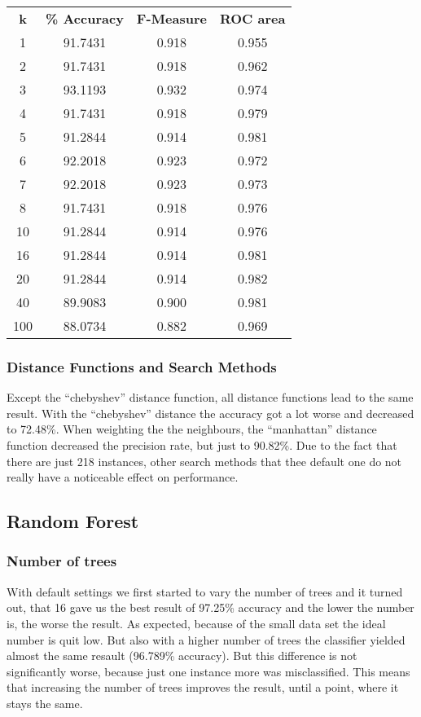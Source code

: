 \documentclass{sig-alternate-05-2015}
\begin{document}
{ \begin{center}
\begin{tabular}{ c | c | c | c }
\textbf{k} & \textbf{\% Accuracy} & \textbf{F-Measure} & \textbf{ROC area} \\
1 & 91.7431 & 0.918 & 0.955 \\
2 & 91.7431 & 0.918 & 0.962 \\
3 & 93.1193 & 0.932 & 0.974 \\
4 & 91.7431 & 0.918 & 0.979 \\
5 & 91.2844 & 0.914 & 0.981 \\
6 & 92.2018 & 0.923 & 0.972 \\
7 & 92.2018 & 0.923 & 0.973 \\
8 & 91.7431 & 0.918 & 0.976 \\
10 & 91.2844 & 0.914 & 0.976 \\
16 & 91.2844 & 0.914 & 0.981 \\
20 & 91.2844 & 0.914 & 0.982 \\
40 & 89.9083 & 0.900 & 0.981 \\
100 & 88.0734 & 0.882 & 0.969 \\
\end{tabular}
\end{center}
 
\subsubsection{Distance Functions and Search Methods}
 
Except the “chebyshev” distance function, all distance functions lead to the same result. With the “chebyshev” distance the accuracy got a lot worse and decreased to 72.48\%. When weighting the the neighbours, the “manhattan” distance function decreased the precision rate, but just to 90.82\%. Due to the fact that there are just 218 instances, other search methods that thee default one do not really have a noticeable effect on performance.
 
\subsection{Random Forest}
 
\subsubsection{Number of trees}
 
With default settings we first started to vary the number of trees and it turned out, that 16 gave us the best result of 97.25\% accuracy and the lower the number is, the worse the result. As expected, because of the small data set the ideal number is quit low. But also with a higher number of trees the classifier yielded almost the same resault (96.789\% accuracy). But this difference is not significantly worse, because just one instance more was misclassified. This means that increasing the number of trees improves the result, until a point, where it stays the same.
 
}
\end{document}
